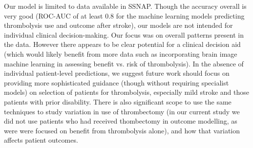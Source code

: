 Our model is limited to data available in SSNAP. Though the accuracy overall is very good (ROC-AUC of at least 0.8 for the machine learning models predicting thrombolysis use and outcome after stroke), our models are not intended for individual clinical decision-making. Our focus was on overall patterns present in the data. However there appears to be clear potential for a clinical decision aid (which would likely benefit from more data such as incorporating brain image machine learning in assessing benefit vs. risk of thrombolysis). In the absence of individual patient-level predictions, we suggest future work should focus on providing more sophisticated guidance (though without requiring specialist models) on selection of patients for thrombolysis, especially mild stroke and those patients with prior disability. There is also significant scope to use the same techniques to study variation in use of thrombectomy (in our current study we did not use patients who had received thombectomy in outcome modelling, as were were focused on benefit from thrombolysis alone), and how that variation affects patient outcomes.